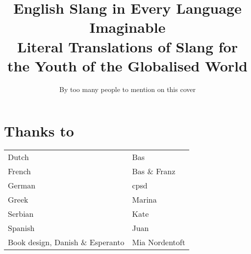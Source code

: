 \documentclass[a5paper,10pt]{book}
\title{\Huge \textbf{English Slang in Every Language Imaginable} \\ \huge Literal Translations of Slang for the Youth of the Globalised World}
\date{}
\author{By too many people to mention on this cover}
\begin{document}
\frontmatter
\maketitle

\tableofcontents

\mainmatter

\chapter{Thanks to}
\begin{tabularx}{\textwidth}{Xl}
Dutch & Bas \\
French & Bas \& Franz \\
German & cpsd \\
Greek & Marina \\
Serbian & Kate \\
Spanish & Juan \\
Book design, Danish \& Espe\-ranto & Mia Nordentoft
\end{tabularx}
\end{document}
